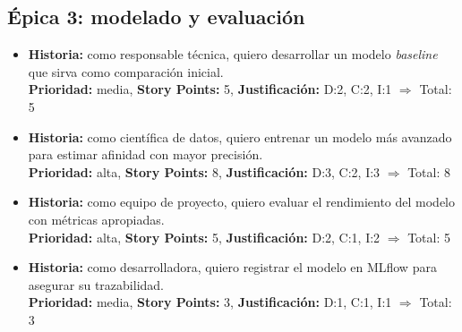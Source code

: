 \documentclass[
11pt, %
]{charter}
\begin{document}
\subsection*{\'Epica 3: modelado y evaluación}
\begin{itemize}
  \item \textbf{Historia:} como responsable técnica, quiero desarrollar un modelo \textit{baseline} que sirva como comparación inicial.\\
  \textbf{Prioridad:} media, \textbf{Story Points:} 5, \textbf{Justificación:} D:2, C:2, I:1 $\Rightarrow$ Total: 5

  \item \textbf{Historia:} como científica de datos, quiero entrenar un modelo más avanzado para estimar afinidad con mayor precisión.\\
  \textbf{Prioridad:} alta, \textbf{Story Points:} 8, \textbf{Justificación:} D:3, C:2, I:3 $\Rightarrow$ Total: 8

  \item \textbf{Historia:} como equipo de proyecto, quiero evaluar el rendimiento del modelo con métricas apropiadas.\\
  \textbf{Prioridad:} alta, \textbf{Story Points:} 5, \textbf{Justificación:} D:2, C:1, I:2 $\Rightarrow$ Total: 5

  \item \textbf{Historia:} como desarrolladora, quiero registrar el modelo en MLflow para asegurar su trazabilidad.\\
  \textbf{Prioridad:} media, \textbf{Story Points:} 3, \textbf{Justificación:} D:1, C:1, I:1 $\Rightarrow$ Total: 3
\end{itemize}
\end{document}
